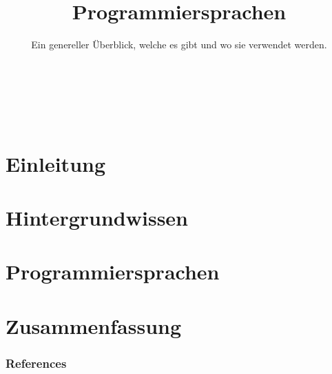 


\title{Programmiersprachen}
\subtitle{Ein genereller Überblick, welche es gibt und wo sie verwendet werden.}




\backgroundTitle
\begin{frame}
    \thispagestyle{empty}
    \begin{columns}
        \column{0.6\paperwidth}
        \color{hhuBlau}
        \LARGE \inserttitle\\[\baselineskip]
        \large \insertauthor
    \end{columns}
\end{frame}
\backgroundNormal

\section{Einleitung}



\section{Hintergrundwissen}





\section{Programmiersprachen}



\section{Zusammenfassung}




\begin{frame}[allowframebreaks]
    \frametitle{References}
\end{frame}




